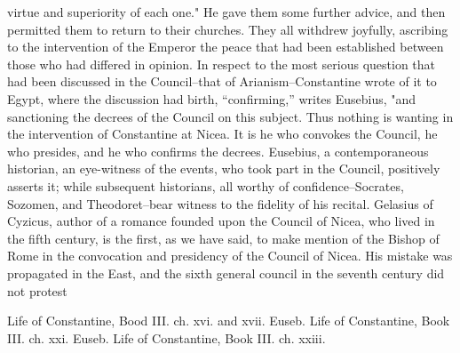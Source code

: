 virtue and superiority of each one." He gave them some further advice, and then permitted them to return to their churches. They all withdrew joyfully, ascribing to the intervention of the Emperor the peace that had been established between those who had differed in opinion. In respect to the most serious question that had been discussed in the Council--that of Arianism--Constantine wrote of it to Egypt, where the discussion had birth, “confirming,” writes Eusebius, "and sanctioning the decrees of the Council on this subject. Thus nothing is wanting in the intervention of Constantine at Nicea. It is he who convokes the Council, he who presides, and he who confirms the decrees. Eusebius, a contemporaneous historian, an eye-witness of the events, who took part in the Council, positively asserts it; while subsequent historians, all worthy of confidence--Socrates, Sozomen, and Theodoret--bear witness to the fidelity of his recital. Gelasius of Cyzicus, author of a romance founded upon the Council of Nicea, who lived in the fifth century, is the first, as we have said, to make mention of the Bishop of Rome in the convocation and presidency of the Council of Nicea. His mistake was propagated in the East, and the sixth general council in the seventh century did not protest

Life of Constantine, Bood III. ch. xvi. and xvii. Euseb. Life of Constantine, Book III. ch. xxi. Euseb. Life of Constantine, Book III. ch. xxiii.

